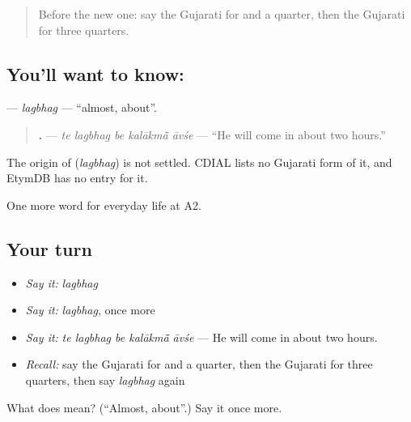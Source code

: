 \label{lesson:GU-C176-lagbhag}



\begin{quote}
Before the new one: say the Gujarati for and a quarter, then the Gujarati for three quarters.
\end{quote}

\subsection*{You'll want to know: }
\textbf{} — \emph{lagbhag} — \textquotedblleft{}almost, about\textquotedblright{}.

\begin{quote}
\textbf{    .} — \emph{te lagbhag be kalākmā̃ āvśe} — \textquotedblleft{}He will come in about two hours.\textquotedblright{}
\end{quote}

\begin{cousinweb}
The origin of \textbf{} (\emph{lagbhag}) is not settled. CDIAL lists no Gujarati form of it, and EtymDB has no entry for it.
\end{cousinweb}

\begin{grammarlens}[title={What you've built}]
One more word for everyday life at A2.
\end{grammarlens}

\subsection*{Your turn}
\begin{itemize}
\raggedright
  \item \emph{Say it:} \emph{lagbhag}
  \item \emph{Say it:} \emph{lagbhag}, once more
  \item \emph{Say it:} \emph{te lagbhag be kalākmā̃ āvśe} — He will come in about two hours.
  \item \emph{Recall:} say the Gujarati for and a quarter, then the Gujarati for three quarters, then say \emph{lagbhag} again
\end{itemize}

\begin{tcolorbox}[breakable,colback=teal!4,colframe=teal!35!black,title={Before you move on}]
What does  mean? (\textquotedblleft{}Almost, about\textquotedblright{}.) Say it once more.
\end{tcolorbox}

